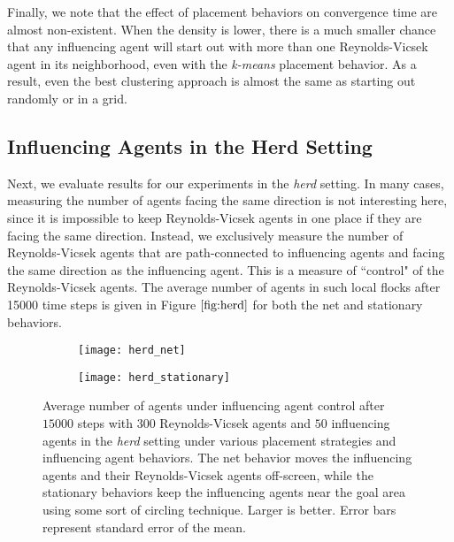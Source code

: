 Finally, we note that the effect of placement behaviors on convergence time
are almost non-existent.
When the density is lower, there is a much smaller chance that any influencing
agent will start out with more than one Reynolds-Vicsek agent in its
neighborhood, even with the \textit{k-means} placement behavior.
As a result, even the best clustering approach is almost the same as starting
out randomly or in a grid.

\subsection{Influencing Agents in the Herd Setting}

Next, we evaluate results for our experiments in the \textit{herd} setting.
In many cases, measuring the number of agents facing the same direction is not
interesting here, since it is impossible to keep Reynolds-Vicsek agents in one place
if they are facing the same direction.
Instead, we exclusively measure the number of Reynolds-Vicsek agents that are
path-connected to influencing agents and facing the same direction as the influencing
agent.
This is a measure of ``control" of the Reynolds-Vicsek agents.
The average number of agents in such local flocks after 15000 time steps is given
in Figure $\ref{fig:herd}$ for both the net and stationary behaviors.
\begin{figure}
    \centering
    \begin{subfigure}[b]{\textwidth}
        \texttt{[image: herd\_net]}
    \end{subfigure}
    \begin{subfigure}[b]{\textwidth}
        \texttt{[image: herd\_stationary]}
    \end{subfigure}
    \caption{Average number of agents under influencing agent control after $15000$
    steps with $300$ Reynolds-Vicsek agents and $50$ influencing agents in the
    \textit{herd} setting under various placement strategies
    and influencing agent behaviors.
    The net behavior moves the influencing agents and their Reynolds-Vicsek agents
    off-screen, while the stationary behaviors keep the influencing agents near
    the goal area using some sort of circling technique.
    Larger is better.
    Error bars represent standard error of the mean.}
    \label{fig:herd}
\end{figure}
